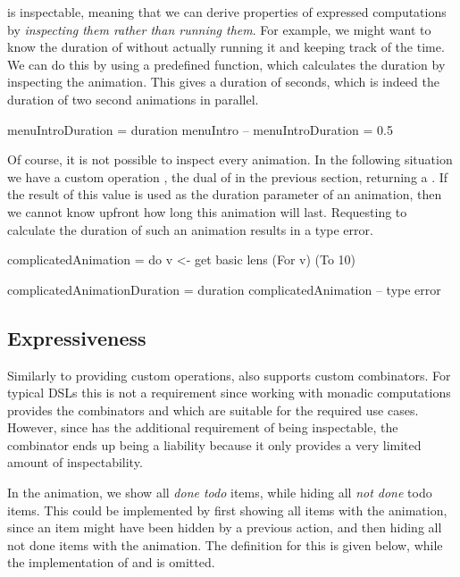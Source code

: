 \dsl{} is inspectable, meaning that we can derive properties of expressed computations by \emph{inspecting them rather than running them}. For example, we might want to know the duration of  without actually running it and keeping track of the time. We can do this by using a predefined  function, which calculates the duration by inspecting the animation. This gives a duration of  seconds, which is indeed the duration of two  second animations in parallel.

\begin{spec}
menuIntroDuration = duration menuIntro
-- menuIntroDuration = 0.5 
\end{spec}

Of course, it is not possible to inspect every animation. In the following situation we have a custom operation , the dual of  in the previous section, returning a . If the result of this value is used as the duration parameter of an animation, then we cannot know upfront how long this animation will last. Requesting to calculate the duration of such an animation results in a type error.

\begin{spec}
complicatedAnimation = do
  v <- get
  basic lens (For v) (To 10)

complicatedAnimationDuration = duration complicatedAnimation
-- type error
\end{spec}

\subsection{Expressiveness}
\label{sec:customcomb}

Similarly to providing custom operations, \dsl{} also supports custom combinators. For typical DSLs this is not a requirement since working with monadic computations provides the combinators \hs{>>=} and  which are suitable for the required use cases. However, since \dsl{} has the additional requirement of being inspectable, the \hs{>>=} combinator ends up being a liability because it only provides a very limited amount of inspectability.

In the  animation, we show all \emph{done todo} items, while hiding all \emph{not done} todo items. This could be implemented by first showing all items with the  animation, since an item might have been hidden by a previous action, and then hiding all not done items with the  animation. The definition for this is given below, while the implementation of  and  is omitted.

